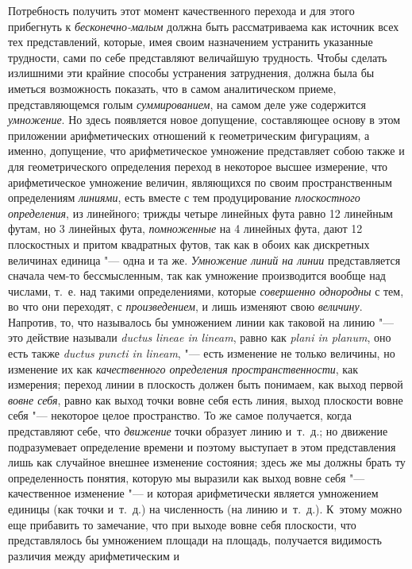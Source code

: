 Потребность получить этот момент качественного перехода и для этого
прибегнуть к {\em бесконечно-малым} должна быть
рассматриваема как источник всех тех представлений, которые, имея своим
назначением устранить указанные трудности, сами по себе представляют
величайшую трудность. Чтобы сделать излишними эти крайние способы
устранения затруднения, должна была бы иметься возможность показать, что в
самом аналитическом приеме, представляющемся голым
{\em суммированием}, на самом деле уже содержится
{\em умножение}. Но здесь появляется новое допущение,
составляющее основу в этом приложении арифметических отношений к
геометрическим фигурациям, а именно, допущение, что арифметическое
умножение представляет собою также и для геометрического определения
переход в некоторое высшее измерение, что арифметическое умножение величин,
являющихся по своим пространственным определениям
{\em линиями}, есть вместе с тем продуцирование
{\em плоскостного определения}, из линейного; трижды
четыре линейных фута равно 12 линейным футам, но 3 линейных фута,
{\em помноженные} на 4 линейных фута, дают 12
плоскостных и притом квадратных футов, так как в обоих как дискретных
величинах единица "--- одна и та же. {\em Умножение линий
на линии} представляется сначала чем-то бессмысленным, так как умножение
производится вообще над числами, т.~е. над такими определениями, которые
{\em совершенно однородны} с тем, во что они переходят,
с {\em произведением}, и лишь изменяют свою
{\em величину}. Напротив, то, что называлось бы
умножением линии как таковой на линию "--- это действие называли
{\em ductus lineae in lineam}, равно как
{\em plani in planum}, оно есть также
{\em ductus puncti in lineam}, "--- есть изменение не
только величины, но изменение их как {\em качественного
определения пространственности}, как измерения; переход линии в плоскость
должен быть понимаем, как выход первой {\em вовне
себя}, равно как выход точки вовне себя есть линия, выход плоскости вовне
себя "--- некоторое целое пространство. То же самое получается, когда
представляют себе, что {\em движение} точки образует
линию и~т.~д.; но движение подразумевает определение времени и поэтому
выступает в этом представления лишь как случайное внешнее изменение
состояния; здесь же мы должны брать ту определенность понятия, которую мы
выразили как выход вовне себя "--- качественное изменение "--- и которая
арифметически является умножением единицы (как точки и~т.~д.) на
численность (на линию и~т.~д.). К~этому можно еще прибавить то замечание,
что при выходе вовне себя плоскости, что представлялось бы умножением
площади на площадь, получается видимость различия между арифметическим и
